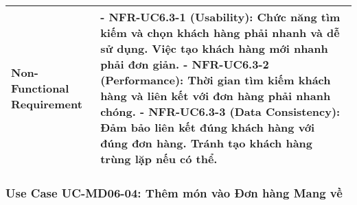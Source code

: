 \begin{longtable}{|m{4cm}|p{11cm}|}
\hline
Non-Functional Requirement & - \textbf{NFR-UC6.3-1 (Usability):} Chức năng tìm kiếm và chọn khách hàng phải nhanh và dễ sử dụng. Việc tạo khách hàng mới nhanh phải đơn giản. \newline - \textbf{NFR-UC6.3-2 (Performance):} Thời gian tìm kiếm khách hàng và liên kết với đơn hàng phải nhanh chóng. \newline - \textbf{NFR-UC6.3-3 (Data Consistency):} Đảm bảo liên kết đúng khách hàng với đúng đơn hàng. Tránh tạo khách hàng trùng lặp nếu có thể. \\
\hline
\end{longtable}

\subsubsection{Use Case UC-MD06-04: Thêm món vào Đơn hàng Mang về}

